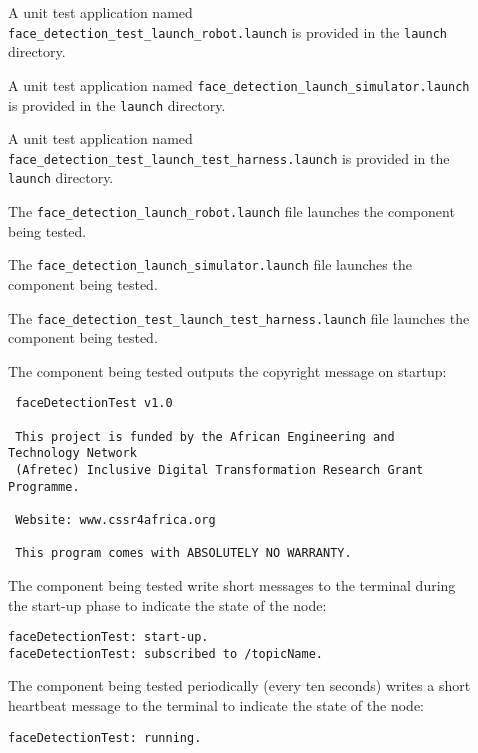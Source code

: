 \documentclass{CSSRforAfrica}
\newcommand{\checkboxChecked}{\fbox{\ding{51}}} %
\newcommand{\checkboxDashed}{\fbox{--}}         %
\begin{document}
\begin{description}

\item[\checkboxChecked] A unit test application named {\small \verb+face_detection_test_launch_robot.launch+} is provided in the {\small \verb+launch+} directory.

\item[\checkboxDashed] A unit test application named {\small \verb+face_detection_launch_simulator.launch+} is provided in the {\small \verb+launch+} directory.

\item[\checkboxChecked] A unit test application named {\small \verb+face_detection_test_launch_test_harness.launch+} is provided in the {\small \verb+launch+} directory.

\item[\checkboxChecked] The {\small \verb+face_detection_launch_robot.launch+} file launches the component being tested.

\item[\checkboxDashed] The {\small \verb+face_detection_launch_simulator.launch+} file launches the component being tested.

\item[\checkboxChecked] The {\small \verb+face_detection_test_launch_test_harness.launch+} file launches the component being tested.

\newpage
\item[\checkboxChecked] The component being tested outputs the copyright message on startup:
{\small 
\begin{verbatim}
 faceDetectionTest v1.0
 
 This project is funded by the African Engineering and Technology Network 
 (Afretec) Inclusive Digital Transformation Research Grant Programme.
 
 Website: www.cssr4africa.org
 
 This program comes with ABSOLUTELY NO WARRANTY.
\end{verbatim}}

\item[\checkboxChecked]  The component being tested write short messages to the terminal during the start-up phase to indicate the state of the node:
{\small 
\begin{verbatim}
faceDetectionTest: start-up.
faceDetectionTest: subscribed to /topicName.
\end{verbatim}}

\item[\checkboxChecked]   The component being tested periodically (every ten seconds) writes a short heartbeat message to the terminal to indicate the state of the node:
{\small 
\begin{verbatim}
faceDetectionTest: running.
\end{verbatim}}


\end{description}
\end{document}
